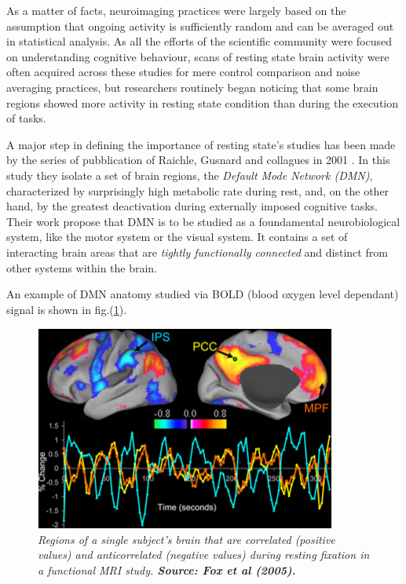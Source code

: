 \documentclass[12pt,openright,twoside,a4paper]{book}
\begin{document}
As a matter of facts, neuroimaging practices were largely based on the assumption that ongoing activity is sufficiently random and can be averaged out in statistical analysis.
As all the efforts of the scientific community were focused on understanding cognitive behaviour, scans of resting state brain activity were often acquired across these studies for mere control comparison and noise averaging practices, but researchers routinely began noticing that some brain regions showed more activity in resting state condition than during the execution of tasks.

A major step in defining the importance of resting state's studies has been made by the series of pubblication of Raichle, Gusnard and collagues in 2001 \cite{default-mode}.
In this study they isolate a set of brain regions, the \textit{Default Mode Network (DMN)}, characterized by surprisingly high metabolic rate during rest, and, on the other hand, by the greatest deactivation during externally imposed cognitive tasks. 
Their work propose that DMN is to be studied as a foundamental neurobiological system, like the motor system or the visual system.
It contains a set of interacting brain areas that are \textit{tightly functionally connected} and distinct from other systems within the brain.

An example of DMN anatomy studied via BOLD ({blood oxygen level dependant}) signal is shown in fig.(\ref{default-mode}).

\begin{figure}[!h]
\centering
\includegraphics[scale=0.6]{default-mode}
\caption{\textit{Regions of a single subject's brain that are correlated (positive values) and anticorrelated (negative values) during resting  fixation in a functional MRI study. \textbf{Source: Fox et al (2005). \cite{DMN}}}}
\label{default-mode}
\end{figure}
\end{document}
